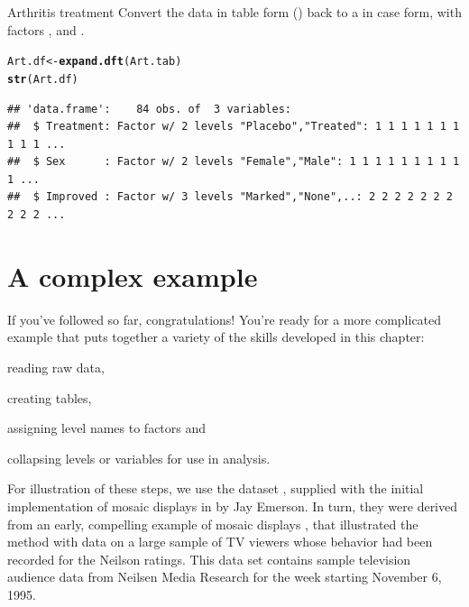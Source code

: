 \documentclass[11pt]{book}\usepackage[]{graphicx}\usepackage[]{color}
\makeatletter
\newcommand{\hlstd}[1]{\textcolor[rgb]{0.345,0.345,0.345}{#1}}%
\newcommand{\hlkwb}[1]{\textcolor[rgb]{0.69,0.353,0.396}{#1}}%
\newcommand{\hlkwd}[1]{\textcolor[rgb]{0.737,0.353,0.396}{\textbf{#1}}}%
\newenvironment{kframe}{%
 \def\at@end@of@kframe{}%
 \ifinner\ifhmode%
  \def\at@end@of@kframe{\end{minipage}}%
  \begin{minipage}{\columnwidth}%
 \fi\fi%
 \def\FrameCommand##1{\hskip\@totalleftmargin \hskip-\fboxsep
 \colorbox{shadecolor}{##1}\hskip-\fboxsep
     \hskip-\linewidth \hskip-\@totalleftmargin \hskip\columnwidth}%
 \MakeFramed {\advance\hsize-\width
   \@totalleftmargin\z@ \linewidth\hsize
   \@setminipage}}%
 {\par\unskip\endMakeFramed%
 \at@end@of@kframe}
\newenvironment{knitrout}{}{} %
\renewenvironment{knitrout}{\small\renewcommand{\baselinestretch}{.85}}{} %
\makeatother
\begin{document}
\begin{Example}{Arthritis treatment}
Convert the  data in table form () back to a 
in case form, with factors
,  and .
\begin{knitrout}
\color{fgcolor}\begin{kframe}
\begin{alltt}
\hlstd{Art.df} \hlkwb{<-} \hlkwd{expand.dft}\hlstd{(Art.tab)}
\hlkwd{str}\hlstd{(Art.df)}
\end{alltt}
\begin{verbatim}
## 'data.frame':	84 obs. of  3 variables:
##  $ Treatment: Factor w/ 2 levels "Placebo","Treated": 1 1 1 1 1 1 1 1 1 1 ...
##  $ Sex      : Factor w/ 2 levels "Female","Male": 1 1 1 1 1 1 1 1 1 1 ...
##  $ Improved : Factor w/ 3 levels "Marked","None",..: 2 2 2 2 2 2 2 2 2 2 ...
\end{verbatim}
\end{kframe}
\end{knitrout}

\end{Example}


\section{A complex example}

If you've followed so far, congratulations! You're ready for a more complicated example
that puts together a variety of the skills developed in this chapter:
\begin{seriate}
  \item reading raw data, 
  \item creating tables, 
  \item assigning level names to factors and
  \item collapsing levels or variables for use in analysis.
\end{seriate}

For illustration of these steps, 
we use the dataset , supplied with
the initial implementation of 
mosaic displays in \R by Jay Emerson. 
In turn, they were derived from an early, compelling example of mosaic displays 
\citep{HartiganKleiner:84},
that illustrated the method with data on a large sample of TV viewers
whose behavior had been recorded for the Neilson ratings.
This data set contains sample television audience data from Neilsen
Media Research for the week starting November 6, 1995.
\end{document}
